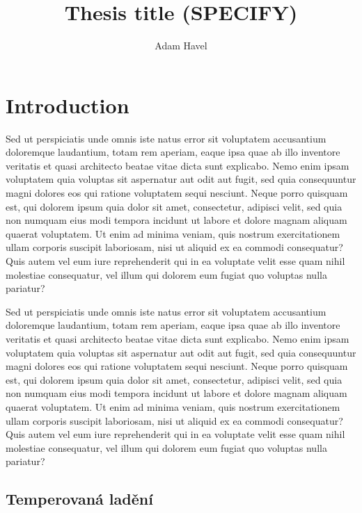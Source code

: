 \documentclass[thesis=M,english,hidelinks]{FITthesis}[2012/10/20]
\title{Thesis title (SPECIFY)}
\author{Adam Havel}
\begin{document}

\chapter{Introduction}

Sed ut perspiciatis unde omnis iste natus error sit voluptatem accusantium doloremque laudantium, totam rem aperiam, eaque ipsa quae ab illo inventore veritatis et quasi architecto beatae vitae dicta sunt explicabo. Nemo enim ipsam voluptatem quia voluptas sit aspernatur aut odit aut fugit, sed quia consequuntur magni dolores eos qui ratione voluptatem sequi nesciunt. Neque porro quisquam est, qui dolorem ipsum quia dolor sit amet, consectetur, adipisci velit, sed quia non numquam eius modi tempora incidunt ut labore et dolore magnam aliquam quaerat voluptatem. Ut enim ad minima veniam, quis nostrum exercitationem ullam corporis suscipit laboriosam, nisi ut aliquid ex ea commodi consequatur? Quis autem vel eum iure \cite{rybicka} reprehenderit qui in ea voluptate velit esse quam nihil molestiae consequatur, vel illum qui dolorem eum fugiat quo voluptas nulla pariatur?

Sed ut perspiciatis unde omnis iste natus error sit voluptatem accusantium doloremque laudantium, totam rem aperiam, eaque ipsa quae ab illo inventore veritatis et quasi architecto beatae vitae dicta sunt explicabo. Nemo enim ipsam voluptatem quia voluptas sit aspernatur aut odit aut fugit, sed quia consequuntur magni dolores eos qui ratione voluptatem sequi nesciunt. Neque porro quisquam est, qui dolorem ipsum quia dolor sit amet, consectetur, adipisci velit, sed quia non numquam eius modi tempora incidunt ut labore et dolore magnam aliquam quaerat voluptatem. Ut enim ad minima veniam, quis nostrum exercitationem ullam corporis suscipit laboriosam, nisi ut aliquid ex ea commodi consequatur? Quis autem vel eum iure \cite{rybicka} reprehenderit qui in ea voluptate velit esse quam nihil molestiae consequatur, vel illum qui dolorem eum fugiat quo voluptas nulla pariatur?

\section{Temperovaná ladění}
\end{document}
